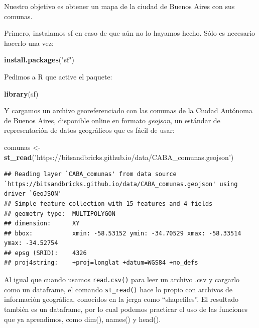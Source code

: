 \documentclass[]{book}
\newenvironment{Shaded}{\begin{snugshade}}{\end{snugshade}}
\newcommand{\KeywordTok}[1]{\textcolor[rgb]{0.13,0.29,0.53}{\textbf{#1}}}
\newcommand{\StringTok}[1]{\textcolor[rgb]{0.31,0.60,0.02}{#1}}
\newcommand{\NormalTok}[1]{#1}
\begin{document}
Nuestro objetivo es obtener un mapa de la ciudad de Buenos Aires con sus
comunas.

Primero, instalamos sf en caso de que aún no lo hayamos hecho. Sólo es
necesario hacerlo una vez:

\begin{Shaded}
\begin{Highlighting}[]
\KeywordTok{install.packages}\NormalTok{(}\StringTok{"sf"}\NormalTok{)}
\end{Highlighting}
\end{Shaded}

Pedimos a R que active el paquete:

\begin{Shaded}
\begin{Highlighting}[]
\KeywordTok{library}\NormalTok{(sf)}
\end{Highlighting}
\end{Shaded}

Y cargamos un archivo georeferenciado con las comunas de la Ciudad
Autónoma de Buenos Aires, disponible online en formato
\href{https://es.wikipedia.org/wiki/GeoJSON}{\emph{geojson}}, un
estándar de representación de datos geográficos que es fácil de usar:

\begin{Shaded}
\begin{Highlighting}[]
\NormalTok{comunas <-}\StringTok{ }\KeywordTok{st_read}\NormalTok{(}\StringTok{'https://bitsandbricks.github.io/data/CABA_comunas.geojson'}\NormalTok{)}
\end{Highlighting}
\end{Shaded}

\begin{verbatim}
## Reading layer `CABA_comunas' from data source `https://bitsandbricks.github.io/data/CABA_comunas.geojson' using driver `GeoJSON'
## Simple feature collection with 15 features and 4 fields
## geometry type:  MULTIPOLYGON
## dimension:      XY
## bbox:           xmin: -58.53152 ymin: -34.70529 xmax: -58.33514 ymax: -34.52754
## epsg (SRID):    4326
## proj4string:    +proj=longlat +datum=WGS84 +no_defs
\end{verbatim}

Al igual que cuando usamos \texttt{read.csv()} para leer un archivo .csv
y cargarlo como un dataframe, el comando \texttt{st\_read()} hace lo
propio con archivos de información geográfica, conocidos en la jerga
como ``shapefiles''. El resultado también es un dataframe, por lo cual
podemos practicar el uso de las funciones que ya aprendimos, como dim(),
names() y head().
\end{document}

